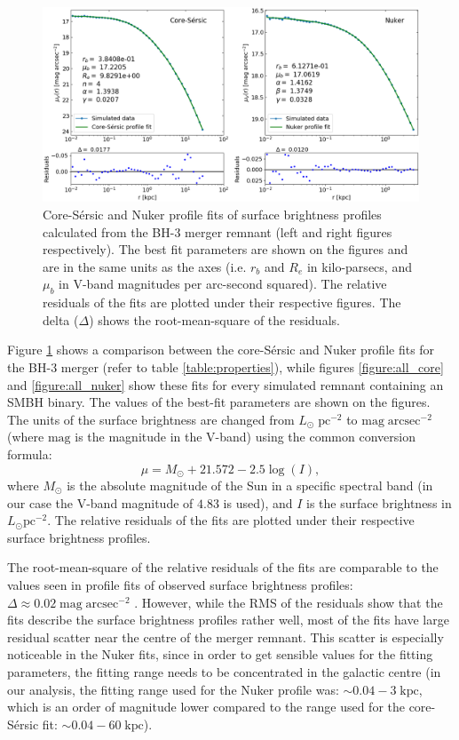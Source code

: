 \documentclass[english, twoside]{HYgradu}
\begin{document}
\begin{figure}[h]
	\centering
	\includegraphics[width=\textwidth]{core_nuker_fits.png}
	\caption{Core-Sérsic and Nuker profile fits of surface brightness profiles calculated from the BH-3 merger remnant (left and right figures respectively). The best fit parameters are shown on the figures and are in the same units as the axes (i.e. $r_b$ and $R_e$ in kilo-parsecs, and $\mu_b$ in V-band magnitudes per arc-second squared). The relative residuals of the fits are plotted under their respective figures. The delta ($\Delta$) shows the root-mean-square of the residuals.}
	\label{figure:core_nuker}
\end{figure}

Figure \ref{figure:core_nuker} shows a comparison between the core-Sérsic and Nuker profile fits for the BH-3 merger (refer to table \ref{table:properties}), while figures \ref{figure:all_core} and \ref{figure:all_nuker} show these fits for every simulated remnant containing an SMBH binary. The values of the best-fit parameters are shown on the figures. The units of the surface brightness are changed from $L_\odot \; \mathrm{pc^{-2}}$ to $\mathrm{mag \; arcsec^{-2}}$ (where $\mathrm{mag}$ is the magnitude in the V-band) using the common conversion formula:
\begin{equation}
\mu = M_\odot + 21.572 - 2.5 \log(I), 
\end{equation}
where $M_\odot$ is the absolute magnitude of the Sun in a specific spectral band (in our case the V-band magnitude of $4.83$ is used), and $I$ is the surface brightness in $L_\odot \mathrm{pc^{-2}}$. The relative residuals of the fits are plotted under their respective surface brightness profiles.

The root-mean-square of the relative residuals of the fits are comparable to the values seen in profile fits of observed surface brightness profiles: $\Delta \approx 0.02 \; \mathrm{mag \; arcsec^{-2}}$ \citep{Dullo2012}. However, while the RMS of the residuals show that the fits describe the surface brightness profiles rather well, most of the fits have large residual scatter near the centre of the merger remnant. This scatter is especially noticeable in the Nuker fits, since in order to get sensible values for the fitting parameters, the fitting range needs to be concentrated in the galactic centre (in our analysis, the fitting range used for the Nuker profile was: $\sim 0.04 - 3 \; \mathrm{kpc}$, which is an order of magnitude lower compared to the range used for the core-Sérsic fit: $\sim 0.04 - 60 \; \mathrm{kpc}$). 
\end{document}
